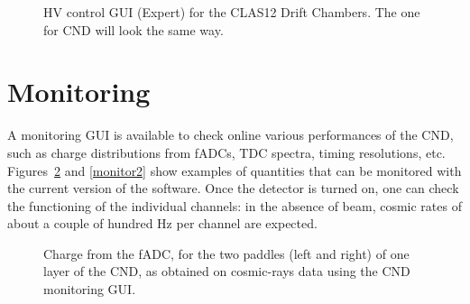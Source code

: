 \documentclass[12pt]{article}
\begin{document}
\begin{figure}
\begin{center}
\caption {HV control GUI (Expert) for the CLAS12 Drift Chambers. The one for CND will look the same way. }
\label{hv_figure2}
\end{center}
\end{figure}

\section{Monitoring}
A monitoring GUI is available to check online various performances of the CND, such as charge distributions from fADCs, TDC spectra, timing resolutions, etc. Figures~\ref{monitor1} and \ref{monitor2} show examples of quantities that can be monitored with the current version of the software. Once the detector is turned on, one can check the functioning of the individual channels: in the absence of beam, cosmic rates of about a couple of hundred Hz per channel are expected. 

\begin{figure}
\begin{center}
\caption {Charge from the fADC, for the two paddles (left and right) of one layer of the CND, as obtained on cosmic-rays data using the CND monitoring GUI. }
\label{monitor1}
\end{center}
\end{figure}
\end{document}
